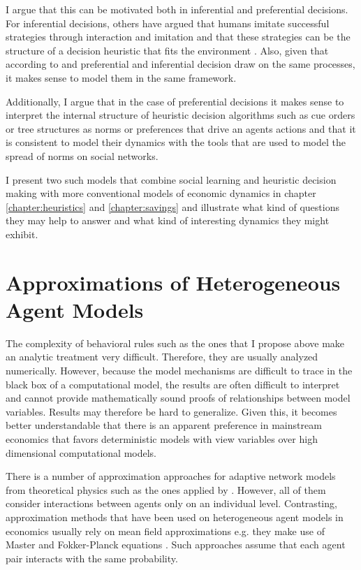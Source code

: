 I argue that this can be motivated both in inferential and preferential decisions. For inferential decisions, others have argued that humans imitate successful strategies through interaction and imitation \citep{Bandura1971, Traulsen2010} and that these strategies can be the structure of a decision heuristic that fits the environment \citep{Garcia-Retamero2009}. Also, given that according to \cite{Weber2009} and \cite{Gigerenzer2011} preferential and inferential decision draw on the same processes, it makes sense to model them in the same framework. 

Additionally, I argue that in the case of preferential decisions it makes sense to interpret the internal structure of heuristic decision algorithms such as cue orders or tree structures as norms or preferences that drive an agents actions and that it is consistent to model their dynamics with the tools that are used to model the spread of norms on social networks.

I present two such models that combine social learning and heuristic decision making with more conventional models of economic dynamics in chapter \ref{chapter:heuristics} and \ref{chapter:savings} and illustrate what kind of questions they may help to answer and what kind of interesting dynamics they might exhibit.

\section{Approximations of Heterogeneous Agent Models}

The complexity of behavioral rules such as the ones that I propose above make an analytic treatment very difficult. Therefore, they are usually analyzed numerically. However, because the model mechanisms are difficult to trace in the black box of a computational model, the results are often difficult to interpret and cannot provide mathematically sound proofs of relationships between model variables. Results may therefore be hard to generalize. Given this, it becomes better understandable that there is an apparent preference in mainstream economics that favors deterministic models with view variables over high dimensional computational models.

There is a number of approximation approaches for adaptive network models from theoretical physics such as the ones applied by \cite{Rogers2013, Wiedermann2015, Min2017}. However, all of them consider interactions between agents only on an individual level. Contrasting, approximation methods that have been used on heterogeneous agent models in economics usually rely on mean field approximations e.g. they make use of Master and Fokker-Planck equations \citep{Aoki1998, Aoki2007, DelliGatti2000, DiGuilmi2008, Chiarella2011a, Landini2014}. Such approaches assume that each agent pair interacts with the same probability.

